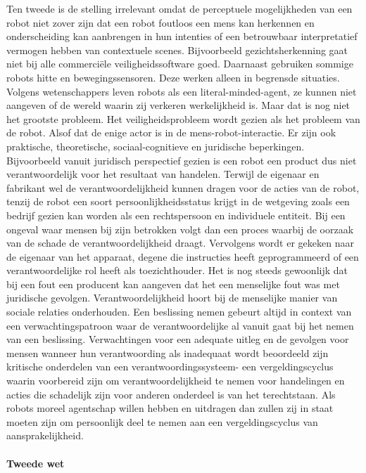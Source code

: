 \documentclass[11pt]{report}
\begin{document}
Ten tweede is de stelling irrelevant omdat de perceptuele mogelijkheden van een robot niet zover zijn dat een robot foutloos een mens kan herkennen en onderscheiding kan aanbrengen in hun intenties of een betrouwbaar interpretatief vermogen hebben van contextuele scenes. Bijvoorbeeld gezichtsherkenning gaat niet bij alle commerciële veiligheidssoftware goed. Daarnaast gebruiken sommige robots hitte en bewegingssensoren. Deze werken alleen in begrensde situaties. Volgens wetenschappers leven robots als  een literal-minded-agent, ze kunnen niet aangeven of de wereld waarin zij verkeren werkelijkheid is.
Maar dat is nog niet het grootste probleem. Het veiligheidsprobleem wordt gezien als het probleem van de robot. Alsof dat de enige actor is in de mens-robot-interactie. Er zijn ook praktische, theoretische, sociaal-cognitieve en juridische beperkingen.
Bijvoorbeeld vanuit juridisch perspectief gezien is een robot een product dus niet verantwoordelijk voor het resultaat van handelen. Terwijl de eigenaar en fabrikant wel de verantwoordelijkheid kunnen dragen voor de acties van de robot, tenzij de robot een soort persoonlijkheidsstatus krijgt in de wetgeving zoals een bedrijf gezien kan worden als een rechtspersoon en individuele entiteit. Bij een ongeval waar mensen bij zijn betrokken volgt dan een proces waarbij de oorzaak van de schade de verantwoordelijkheid draagt. Vervolgens wordt er gekeken naar de eigenaar van het apparaat, degene die instructies heeft geprogrammeerd of een verantwoordelijke rol heeft als toezichthouder. Het is nog steeds gewoonlijk dat bij een fout een producent kan aangeven dat het een menselijke fout was met juridische gevolgen.
Verantwoordelijkheid hoort bij de menselijke manier van sociale relaties onderhouden. Een beslissing nemen gebeurt altijd in context van een verwachtingspatroon waar de verantwoordelijke al vanuit gaat bij het nemen van een beslissing. Verwachtingen voor een adequate uitleg en de gevolgen voor mensen wanneer hun verantwoording als inadequaat wordt beoordeeld zijn kritische onderdelen van een verantwoordingssysteem- een vergeldingscyclus waarin voorbereid zijn om verantwoordelijkheid te nemen voor handelingen en acties die schadelijk zijn voor anderen onderdeel is van het terechtstaan. Als robots moreel agentschap willen hebben en uitdragen dan zullen zij in staat moeten zijn om persoonlijk deel te nemen aan een vergeldingscyclus van aansprakelijkheid.
\paragraph{Tweede wet}
\end{document}
